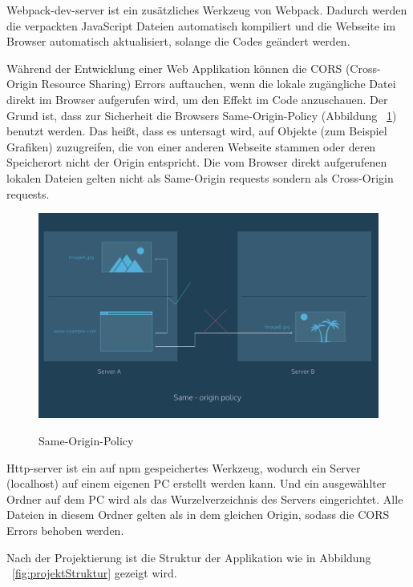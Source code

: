  Webpack-dev-server ist ein zusätzliches Werkzeug von Webpack. Dadurch werden die verpackten JavaScript Dateien automatisch kompiliert und die Webseite im Browser automatisch aktualisiert, solange die Codes geändert werden.
 
 Während der Entwicklung einer Web Applikation können die CORS (Cross-Origin Resource Sharing) Errors auftauchen, wenn die lokale zugängliche Datei direkt im Browser aufgerufen wird, um den Effekt im Code anzuschauen. Der Grund ist, dass zur Sicherheit die Browsers Same-Origin-Policy (Abbildung ~\ref{fig:Same-Origin-Policy}) benutzt werden. Das heißt, dass es untersagt wird, auf Objekte (zum Beispiel Grafiken) zuzugreifen, die von einer anderen Webseite stammen oder deren Speicherort nicht der Origin entspricht. Die vom Browser direkt aufgerufenen lokalen Dateien gelten nicht als Same-Origin requests sondern als Cross-Origin requests.
 
\begin{figure}[ht]
\centering
\caption[Same-Origin-Policy]{Same-Origin-Policy}
\includegraphics[width=\textwidth]{images/sameOrigin.png}
\label{fig:Same-Origin-Policy}
\end{figure}
 
 Http-server ist ein auf npm gespeichertes Werkzeug, wodurch ein Server (localhost) auf einem eigenen PC erstellt werden kann. Und ein ausgewählter Ordner auf dem PC wird als das Wurzelverzeichnis des Servers eingerichtet. Alle Dateien in diesem Ordner gelten als in dem gleichen Origin, sodass die CORS Errors behoben werden.
 
 Nach der Projektierung ist die Struktur der Applikation wie in Abbildung ~\ref{fig:projektStruktur} gezeigt wird.
 
